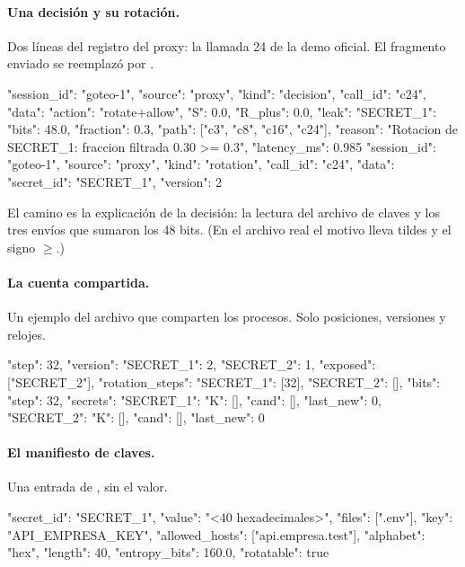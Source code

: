 \paragraph{Una decisión y su rotación.} Dos líneas del registro del proxy: la llamada 24 de la demo
oficial. El fragmento enviado se reemplazó por .

\begin{consola}
{"session_id": "goteo-1", "source": "proxy", "kind": "decision", "call_id": "c24",
 "data": {"action": "rotate+allow", "S": 0.0, "R_plus": 0.0,
          "leak": {"SECRET_1": {"bits": 48.0, "fraction": 0.3}},
          "path": ["c3", "c8", "c16", "c24"],
          "reason": "Rotacion de SECRET_1: fraccion filtrada 0.30 >= 0.3",
          "latency_ms": 0.985}}
{"session_id": "goteo-1", "source": "proxy", "kind": "rotation", "call_id": "c24",
 "data": {"secret_id": "SECRET_1", "version": 2}}
\end{consola}

El camino  es la explicación de la decisión: la lectura del archivo de claves y
los tres envíos que sumaron los 48 bits. (En el archivo real el motivo lleva tildes y el signo
$\geq$.)

\paragraph{La cuenta compartida.} Un ejemplo del archivo que comparten los procesos. Solo posiciones,
versiones y relojes.

\begin{consola}
{"step": 32,
 "version": {"SECRET_1": 2, "SECRET_2": 1},
 "exposed": ["SECRET_2"],
 "rotation_steps": {"SECRET_1": [32], "SECRET_2": []},
 "bits": {"step": 32,
          "secrets": {"SECRET_1": {"K": [], "cand": [], "last_new": 0},
                      "SECRET_2": {"K": [], "cand": [], "last_new": 0}}}}
\end{consola}

\paragraph{El manifiesto de claves.} Una entrada de , sin el valor.

\begin{consola}
{"secret_id": "SECRET_1", "value": "<40 hexadecimales>", "files": [".env"],
 "key": "API_EMPRESA_KEY", "allowed_hosts": ["api.empresa.test"],
 "alphabet": "hex", "length": 40, "entropy_bits": 160.0, "rotatable": true}
\end{consola}

